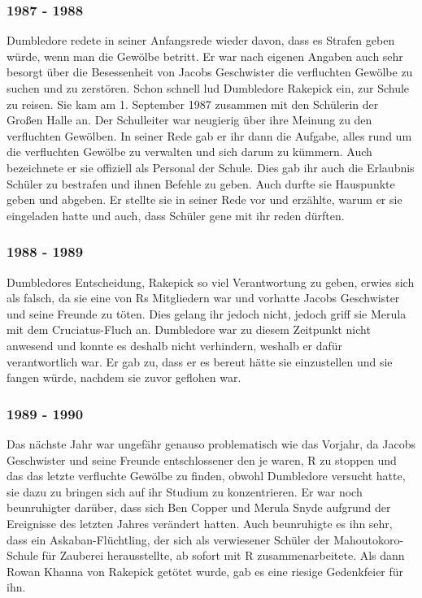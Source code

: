 \documentclass[a4paper, 10pt]{article}
\begin{document}
\subsubsection*{1987 - 1988}
Dumbledore redete in seiner Anfangsrede wieder davon, dass es Strafen geben würde, wenn man die Gewölbe betritt. Er war nach eigenen Angaben auch sehr besorgt über die Besessenheit von Jacobs Geschwister die verfluchten Gewölbe zu suchen und zu zerstören. Schon schnell lud Dumbledore Rakepick ein, zur Schule zu reisen. Sie kam am 1. September 1987 zusammen mit den Schülerin der Großen Halle an. Der Schulleiter war neugierig über ihre Meinung zu den verfluchten Gewölben. In seiner Rede gab er ihr dann die Aufgabe, alles rund um die verfluchten Gewölbe zu verwalten und sich darum zu kümmern. Auch bezeichnete er sie offiziell als Personal der Schule. Dies gab ihr auch die Erlaubnis Schüler zu bestrafen und ihnen Befehle zu geben. Auch durfte sie Hauspunkte geben und abgeben. Er stellte sie in seiner Rede vor und erzählte, warum er sie eingeladen hatte und auch, dass Schüler gene mit ihr reden dürften.
\subsubsection*{1988 - 1989}
Dumbledores Entscheidung, Rakepick so viel Verantwortung zu geben, erwies sich als falsch, da sie eine von Rs Mitgliedern war und vorhatte Jacobs Geschwister und seine Freunde zu töten. Dies gelang ihr jedoch nicht, jedoch griff sie Merula mit dem Cruciatus-Fluch an. Dumbledore war zu diesem Zeitpunkt nicht anwesend und konnte es deshalb nicht verhindern, weshalb er dafür verantwortlich war. Er gab zu, dass er es bereut hätte sie einzustellen und sie fangen würde, nachdem sie zuvor geflohen war.
\subsubsection*{1989 - 1990}
Das nächste Jahr war ungefähr genauso problematisch wie das Vorjahr, da Jacobs Geschwister und seine Freunde entschlossener den je waren, R zu stoppen und das das letzte verfluchte Gewölbe zu finden, obwohl Dumbledore versucht hatte, sie dazu zu bringen sich auf ihr Studium zu konzentrieren. Er war noch beunruhigter darüber, dass sich Ben Copper und Merula Snyde aufgrund der Ereignisse des letzten Jahres verändert hatten. Auch beunruhigte es ihn sehr, dass ein Askaban-Flüchtling, der sich als verwiesener Schüler der Mahoutokoro-Schule für Zauberei herausstellte, ab sofort mit R zusammenarbeitete. Als dann Rowan Khanna von Rakepick getötet wurde, gab es eine riesige Gedenkfeier für ihn.
\end{document}
